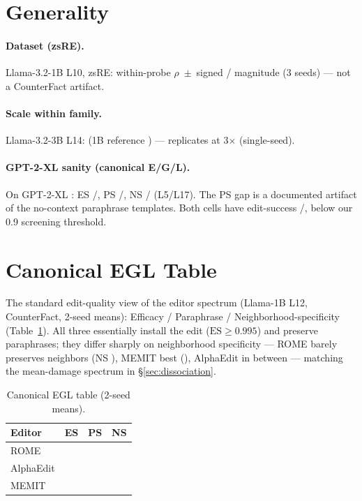 \section{Generality}
\label{app:generality}

\paragraph{Dataset (zsRE).} Llama-3.2-1B L10, zsRE: within-probe $\rho$
\zsreSigned{}\,$\pm$\,\zsreSignedSD{} signed / \zsreMag{} magnitude (3 seeds)
--- not a CounterFact artifact.

\paragraph{Scale within family.} Llama-3.2-3B L14: \llamaThreeBLfourteen{}
(1B reference \llamaOneBLfourteenRef{}) --- replicates at 3$\times$ (single-seed).

\paragraph{GPT-2-XL sanity (canonical E/G/L).} On GPT-2-XL
\citep{radford2019gpt2}: ES \gptEsL{}/\gptEsH{}, PS
\gptPsL{}/\gptPsH{}, NS \gptNsL{}/\gptNsH{} (L5/L17). The PS gap is a
documented artifact of the no-context paraphrase templates. Both cells have
edit-success \gptEsrL{}/\gptEsrH{}, below our 0.9 screening threshold.

\section{Canonical EGL Table}
\label{app:egl}
The standard edit-quality view of the editor spectrum (Llama-1B L12,
CounterFact, 2-seed means): Efficacy / Paraphrase / Neighborhood-specificity
(Table~\ref{tab:egl}). All three essentially install the edit ($\text{ES}\ge
0.995$) and preserve paraphrases; they differ sharply on neighborhood
specificity --- ROME barely preserves neighbors (NS \eglRomeNS{}), MEMIT best
(\eglMemitNS{}), AlphaEdit in between --- matching the mean-damage spectrum in
\S\ref{sec:dissociation}.

\begin{table}[h]
\centering\small
\begin{tabular}{@{}lccc@{}}
\toprule
Editor & ES & PS & NS \\
\midrule
ROME      & \eglRomeES{}  & \eglRomePS{}  & \textbf{\eglRomeNS{}} \\
AlphaEdit & \eglAlphaES{} & \eglAlphaPS{} & \eglAlphaNS{} \\
MEMIT     & \eglMemitES{} & \eglMemitPS{} & \textbf{\eglMemitNS{}} \\
\bottomrule
\end{tabular}
\caption{Canonical EGL table (2-seed means).}
\label{tab:egl}
\end{table}

